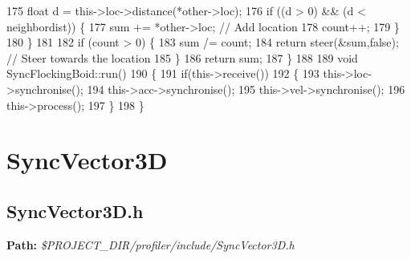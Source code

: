 \begin{DoxyCodeInclude}
175         \textcolor{keywordtype}{float} d = this->loc->distance(*other->loc);
176         \textcolor{keywordflow}{if} ((d > 0) && (d < neighbordist)) \{
177             sum += *other->loc; \textcolor{comment}{// Add location}
178             count++;
179         \}
180     \}
181     
182     \textcolor{keywordflow}{if} (count > 0) \{
183         sum /= count;
184         \textcolor{keywordflow}{return} steer(&sum,\textcolor{keyword}{false});  \textcolor{comment}{// Steer towards the location}
185     \}
186     \textcolor{keywordflow}{return} sum;
187 \}
188 
189 \textcolor{keywordtype}{void} SyncFlockingBoid::run()
190 \{
191     \textcolor{keywordflow}{if}(this->receive())
192     \{
193         this->loc->synchronise();
194         this->acc->synchronise();
195         this->vel->synchronise();
196         this->process();
197     \}
198 \}
\end{DoxyCodeInclude}
 \hypertarget{_benchmark_program_BenchmarkProgramSyncVector3D}{}\section{Sync\+Vector3\+D}\label{_benchmark_program_BenchmarkProgramSyncVector3D}
\hypertarget{_benchmark_program_BenchmarkProgramSyncVector3D_h}{}\subsection{Sync\+Vector3\+D.\+h}\label{_benchmark_program_BenchmarkProgramSyncVector3D_h}
{\bfseries Path\+:} {\itshape \$\+P\+R\+O\+J\+E\+C\+T\+\_\+\+D\+I\+R/profiler/include/\+Sync\+Vector3\+D.h} 
